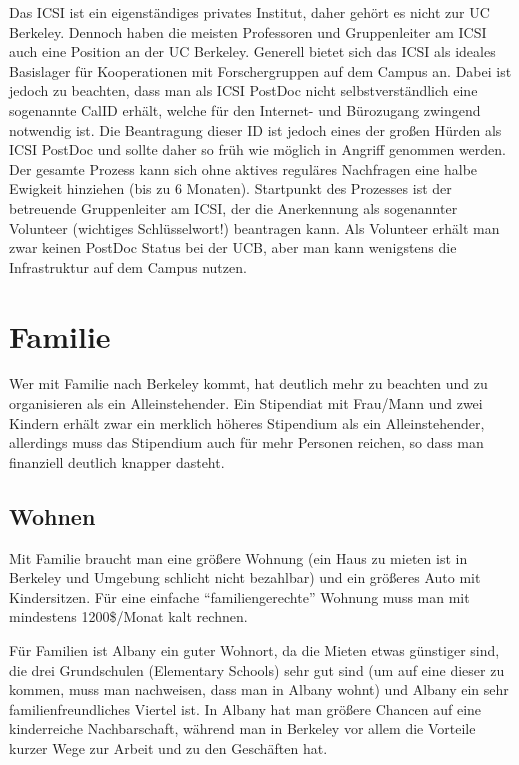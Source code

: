 \documentclass[a4paper]{scrreprt}
\begin{document}
Das ICSI ist ein eigenständiges privates Institut, daher gehört es nicht zur UC Berkeley. 
Dennoch haben die meisten Professoren und Gruppenleiter am ICSI auch eine Position an der UC Berkeley. 
Generell bietet sich das ICSI als ideales Basislager für Kooperationen mit Forschergruppen auf dem Campus an. 
Dabei ist jedoch zu beachten, dass man als ICSI PostDoc nicht selbstverständlich eine sogenannte CalID erhält, 
welche für den Internet- und Bürozugang zwingend notwendig ist. Die Beantragung dieser ID ist jedoch eines der großen Hürden als ICSI PostDoc und sollte daher so früh wie möglich in Angriff genommen werden. Der gesamte Prozess kann sich ohne aktives reguläres Nachfragen eine halbe Ewigkeit hinziehen (bis zu 6 Monaten). Startpunkt des Prozesses ist der betreuende Gruppenleiter am ICSI, der die Anerkennung als sogenannter Volunteer (wichtiges Schlüsselwort!) beantragen kann. Als Volunteer erhält man zwar keinen PostDoc Status bei der UCB, aber man kann wenigstens die Infrastruktur auf dem Campus nutzen. 


\chapter{Familie}

Wer mit Familie nach Berkeley kommt, hat deutlich mehr zu beachten und zu organisieren als ein Alleinstehender. Ein Stipendiat mit Frau/Mann und zwei Kindern erhält zwar ein merklich höheres Stipendium als ein Alleinstehender, allerdings muss das Stipendium auch für mehr Personen reichen, so dass man finanziell deutlich knapper dasteht.


\section{Wohnen}

Mit Familie braucht man eine größere Wohnung (ein Haus zu mieten ist in Berkeley und Umgebung schlicht nicht bezahlbar) und ein größeres Auto mit Kindersitzen. Für eine einfache "`familiengerechte"' Wohnung muss man mit  mindestens 1200\$/Monat kalt rechnen.

Für Familien ist Albany ein guter Wohnort, da die Mieten etwas günstiger sind, die drei Grundschulen (Elementary Schools) sehr gut sind (um auf eine dieser zu kommen, muss man nachweisen, dass man in Albany wohnt) und Albany ein sehr familienfreundliches Viertel ist. In Albany hat man größere Chancen auf eine kinderreiche Nachbarschaft, während man in Berkeley vor allem die Vorteile kurzer Wege zur Arbeit und zu den Geschäften hat.
\end{document}
